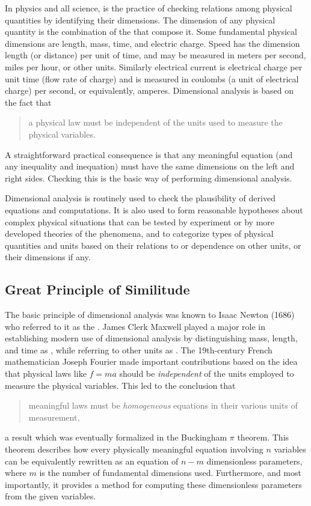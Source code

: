 In physics and all science,  is the practice of checking relations among physical quantities by identifying their dimensions. The dimension of any physical quantity is the combination of the  that compose it. Some fundamental physical dimensions are length, mass, time, and electric charge. Speed has the dimension length (or distance) per unit of time, and may be measured in meters per second, miles per hour, or other units. Similarly electrical current is electrical charge per unit time (flow rate of charge) and is measured in coulombs (a unit of electrical charge) per second, or equivalently, amperes. Dimensional analysis is based on the fact that 
\begin{quote}
a physical law must be independent of the units used to measure the physical variables. 
\end{quote}
A straightforward practical consequence is that any meaningful equation (and any inequality and inequation) must have the same dimensions on the left and right sides. Checking this is the basic way of performing dimensional analysis.

Dimensional analysis is routinely used to check the plausibility of derived equations and computations. It is also used to form reasonable hypotheses about complex physical situations that can be tested by experiment or by more developed theories of the phenomena, and to categorize types of physical quantities and units based on their relations to or dependence on other units, or their dimensions if any.


\subsection{Great Principle of Similitude}
The basic principle of dimensional analysis was known to Isaac Newton (1686) who referred to it as the . James Clerk Maxwell played a major role in establishing modern use of dimensional analysis by distinguishing mass, length, and time as , while referring to other units as . The 19th-century French mathematician Joseph Fourier made important contributions based on the idea that physical laws like $f = ma$ should be \emph{independent} of the units employed to measure the physical variables. This led to the conclusion that
\begin{quote}
meaningful laws must be \emph{homogeneous} equations in their various units of measurement,
\end{quote}  
a result which was eventually formalized in the Buckingham $\pi$ theorem. This theorem describes how every physically meaningful equation involving $n$ variables can be equivalently rewritten as an equation of $n - m$ dimensionless parameters, where $m$ is the number of fundamental dimensions used. Furthermore, and most importantly, it provides a method for computing these dimensionless parameters from the given variables.

